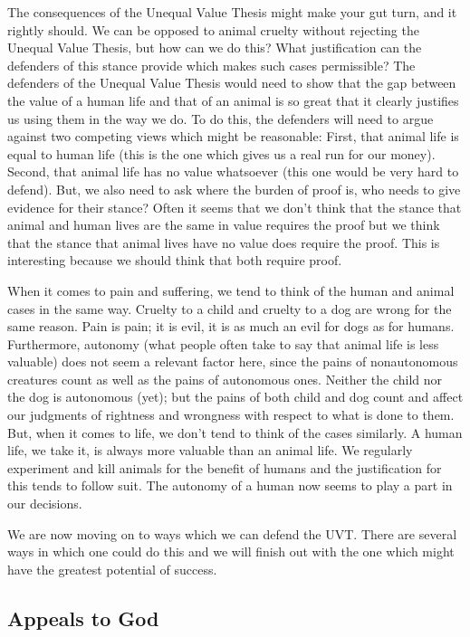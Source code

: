 The consequences of the Unequal Value Thesis might make your gut turn, and it rightly should. We can be opposed to animal cruelty without rejecting the Unequal Value Thesis, but how can we do this? What justification can the defenders of this stance provide which makes such cases permissible? The defenders of the Unequal Value Thesis would need to show that the gap between the value of a human life and that of an animal is so great that it clearly justifies us using them in the way we do. To do this, the defenders will need to argue against two competing views which might be reasonable: First, that animal life is equal to human life (this is the one which gives us a real run for our money). Second, that animal life has no value whatsoever (this one would be very hard to defend). But, we also need to ask where the burden of proof is, who needs to give evidence for their stance? Often it seems that we don’t think that the stance that animal and human lives are the same in value requires the proof but we think that the stance that animal lives have no value does require the proof. This is interesting because we should think that both require proof. 

When it comes to pain and suffering, we tend to think of the human and animal cases in the same way. Cruelty to a child and cruelty to a dog are wrong for the same reason.  Pain is pain; it is evil, it is as much an evil for dogs as for humans. Furthermore, autonomy (what people often take to say that animal life is less valuable) does not seem a relevant factor here, since the pains of nonautonomous creatures count as well as the pains of autonomous ones. Neither the child nor the dog is autonomous (yet); but the pains of both child and dog count and affect our judgments of rightness and wrongness with respect to what is done to them. But, when it comes to life, we don’t tend to think of the cases similarly. A human life, we take it, is always more valuable than an animal life. We regularly experiment and kill animals for the benefit of humans and the justification for this tends to follow suit. The autonomy of a human now seems to play a part in our decisions.

We are now moving on to ways which we can defend the UVT. There are several ways in which one could do this and we will finish out with the one which might have the greatest potential of success.

\subsection{Appeals to God}

